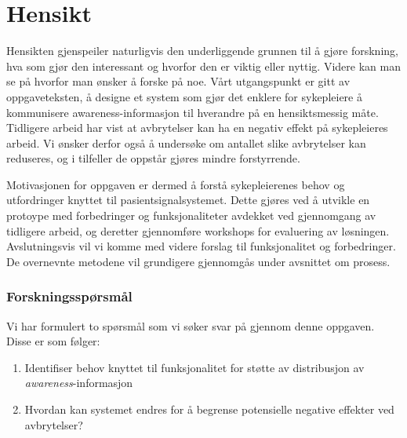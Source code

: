 \section{Hensikt}
\label{chp: hensikt}

Hensikten gjenspeiler naturligvis den underliggende grunnen til å gjøre forskning, hva som gjør den interessant og hvorfor den er viktig eller nyttig. Videre kan man se på hvorfor man ønsker å forske på noe. Vårt utgangspunkt er gitt av oppgaveteksten, å designe et system som gjør det enklere for sykepleiere å kommunisere awareness-informasjon til hverandre på en hensiktsmessig måte. Tidligere arbeid har vist at avbrytelser kan ha en negativ effekt på sykepleieres arbeid. Vi ønsker derfor også å undersøke om antallet slike avbrytelser kan reduseres, og i tilfeller de oppstår gjøres mindre forstyrrende. 

\noindent
Motivasjonen for oppgaven er dermed å forstå sykepleierenes behov og utfordringer knyttet til pasientsignalsystemet. Dette gjøres ved å utvikle en protoype med forbedringer og funksjonaliteter avdekket ved gjennomgang av tidligere arbeid, og deretter gjennomføre workshops for evaluering av løsningen. Avslutningsvis vil vi komme med videre forslag til funksjonalitet og forbedringer. De overnevnte metodene vil grundigere gjennomgås under avsnittet om prosess. 

\subsubsection{Forskningsspørsmål}
Vi har formulert to spørsmål som vi søker svar på gjennom denne oppgaven. Disse er som følger:

\begin{enumerate}
\item Identifiser behov knyttet til funksjonalitet for støtte av distribusjon av \emph{awareness}-informasjon
\item Hvordan kan systemet endres for å begrense potensielle negative effekter ved avbrytelser?
\end{enumerate}
